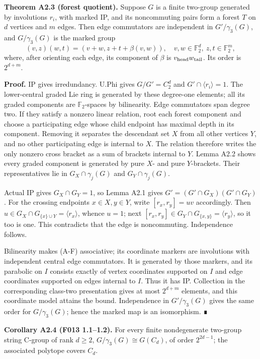 \documentclass[
  11pt,
  a4paper,
]{article}
\begin{document}
\textbf{Theorem A2.3 (forest quotient).} Suppose \(G\) is a finite
two-group generated by involutions \(r_i\), with marked IP, and its
noncommuting pairs form a forest \(T\) on \(d\) vertices and \(m\)
edges. Then edge commutators are independent in \(G'/\gamma_3(G)\), and
\(G/\gamma_3(G)\) is the marked group \[
 (v,z)(w,t)=(v+w,z+t+\beta(v,w)),\quad
 v,w\in\mathbb F_2^d,\ z,t\in\mathbb F_2^m,               \tag{A-F}
\] where, after orienting each edge, its component of \(\beta\) is
\(v_{\rm head}w_{\rm tail}\). Its order is \(2^{d+m}\).

\textbf{Proof.} IP gives irredundancy. U.Phi gives \(G/G'=C_2^d\) and
\(G'\cap\langle r_i\rangle=1\). The lower-central graded Lie ring is
generated by these degree-one elements; all its graded components are
\(\mathbb F_2\)-spaces by bilinearity. Edge commutators span degree two.
If they satisfy a nonzero linear relation, root each forest component
and choose a participating edge whose child endpoint has maximal depth
in its component. Removing it separates the descendant set \(X\) from
all other vertices \(Y\), and no other participating edge is internal to
\(X\). The relation therefore writes the only nonzero cross bracket as a
sum of brackets internal to \(Y\). Lemma A2.2 shows every graded
component is generated by pure \(X\)- and pure \(Y\)-brackets. Their
representatives lie in \(G_X\cap\gamma_j(G)\) and
\(G_Y\cap\gamma_j(G)\).

Actual IP gives \(G_X\cap G_Y=1\), so Lemma A2.1 gives
\(G'=(G'\cap G_X)(G'\cap G_Y)\). For the crossing endpoints
\(x\in X,y\in Y\), write \([r_x,r_y]=uv\) accordingly. Then
\(u\in G_X\cap G_{\{x\}\cup Y}=\langle r_x\rangle\), whence \(u=1\);
next \([r_x,r_y]\in G_Y\cap G_{\{x,y\}}=\langle r_y\rangle\), so it too
is one. This contradicts that the edge is noncommuting. Independence
follows.

Bilinearity makes (A-F) associative; its coordinate markers are
involutions with independent central edge commutators. It is generated
by those markers, and its parabolic on \(I\) consists exactly of vertex
coordinates supported on \(I\) and edge coordinates supported on edges
internal to \(I\). Thus it has IP. Collection in the corresponding
class-two presentation gives at most \(2^{d+m}\) elements, and this
coordinate model attains the bound. Independence in \(G'/\gamma_3(G)\)
gives the same order for \(G/\gamma_3(G)\); hence the marked map is an
isomorphism. ∎

\textbf{Corollary A2.4 (F013 1.1--1.2).} For every finite nondegenerate
two-group string C-group of rank \(d\ge2\),
\(G/\gamma_3(G)\cong G(C_d)\), of order \(2^{2d-1}\); the associated
polytope covers \(C_d\).
\end{document}
